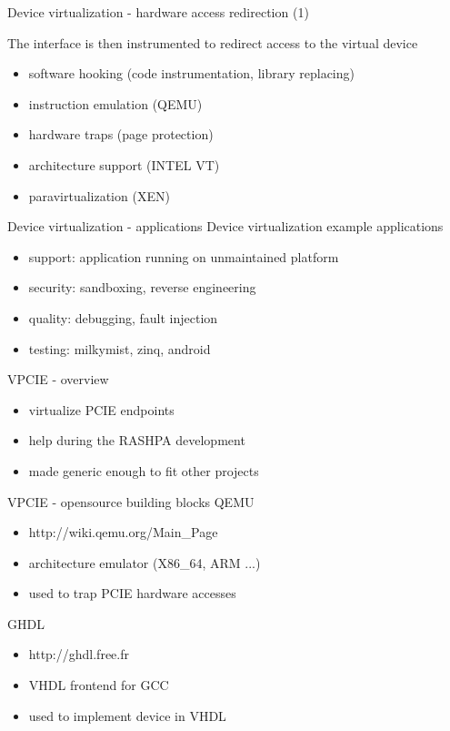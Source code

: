 \documentclass{beamer}
\begin{document}
\begin{frame}{Device virtualization - hardware access redirection (1)}
  \begin{small}
  The interface is then instrumented to redirect access to the virtual device
  \begin{itemize}
  \item software hooking (code instrumentation, library replacing)
  \item instruction emulation (QEMU)
  \item hardware traps (page protection)
  \item architecture support (INTEL VT)
  \item paravirtualization (XEN)
  \end{itemize}
  \end{small}
\end{frame}

\begin{frame}{Device virtualization - applications}
  Device virtualization example applications
  \begin{itemize}
  \item support: application running on unmaintained platform
  \item security: sandboxing, reverse engineering
  \item quality: debugging, fault injection
  \item testing: milkymist, zinq, android
  \end{itemize}
\end{frame}

\begin{frame}{VPCIE - overview}
  \begin{itemize}
  \item virtualize PCIE endpoints
  \item help during the RASHPA development
  \item made generic enough to fit other projects
  \end{itemize}
\end{frame}

\begin{frame}{VPCIE - opensource building blocks}
  QEMU 
  \begin{itemize}
  \item http://wiki.qemu.org/Main\_Page
  \item architecture emulator (X86\_64, ARM ...)
  \item used to trap PCIE hardware accesses
  \end{itemize}
  GHDL
  \begin{itemize}
  \item http://ghdl.free.fr
  \item VHDL frontend for GCC
  \item used to implement device in VHDL
  \end{itemize}
\end{frame}
\end{document}
